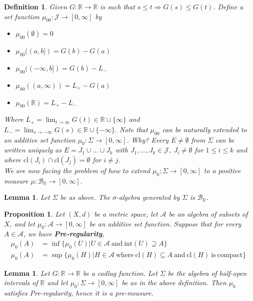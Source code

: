 \documentclass[letterpaper, 12pt]{article}
\newcommand{\cB}{\mathcal{B}}
\newcommand{\cJ} {\mathcal{J}}
\newcommand{\bR}{\mathbb{R}}
\newcommand{\sA}{\mathcal{A}}
\theoremstyle{stdthm}
\newtheorem{lem}[thm]{Lemma}
\newtheorem{prop}[thm]{Proposition}
\theoremstyle{stddef}
\newtheorem{defn}[thm]{Definition}
\theoremstyle{stdnonum}
\theoremstyle{stdqands}
\theoremstyle{stdbold}
\begin{document}
\begin{defn}
Given $G: \bR \rightarrow \bR$ is such that $s\leq t \Rightarrow G(s) \leq G(t)$. Define a set function $\mu_{00}: \cJ \rightarrow [0,\infty]$ by
\begin{itemize}
\item $\mu_{00}(\emptyset) = 0$
\item $\mu_{00} ((a,b]) = G(b) - G(a)$
\item $\mu_{00}((-\infty,b]) = G(b) - L_{-}$
\item $\mu_{00}((a,\infty)) = L_{+} - G(a)$
\item $\mu_{00}(\bR) = L_{+} - L_{-}$
\end{itemize}
Where $L_{+} = \lim_{t\rightarrow \infty} G(t) \in \bR \cup \{\infty\}$ and $L_{-}= \lim_{s\rightarrow -\infty} G(s) \in \bR \cup \{-\infty\}$. Note that $\mu_{00}$ can be naturally extended to an additive set function $\mu_0: \Sigma \rightarrow [0,\infty]$. Why? Every $E \neq \emptyset$ from $\Sigma$ can be written uniquely as $E = J_1 \cup \dots \cup J_k$ with  $J_1,\dots, J_k \in \cJ$, $J_i \neq \emptyset$ for $1\leq i \leq k$ and where $\text{cl}(J_i) \cap \text{cl}(J_j) = \emptyset$ for $i\neq j$.   \\

\noindent We are now facing the problem of how to extend $\mu_0: \Sigma \rightarrow [0,\infty]$ to a positive measure $\mu: \cB_\bR \rightarrow [0,\infty]$. 
\end{defn}

\begin{lem}
Let $\Sigma$ be as above. The $\sigma$-algebra generated by $\Sigma$ is $\cB_\bR$. 
\end{lem}

\begin{prop}
Let $(X,d)$ be a metric space, let $\sA$ be an algebra of subsets of $X$, and let $\mu_0: \sA \rightarrow  [0,\infty]$ be an additive set function. Suppose that for every $A \in \sA$, we have {\bf Pre-regularity},
\begin{align*}
 \mu_0 (A) &= \inf\{ \mu_0(U) | U \in \sA \mathrm{\ and\ int}(U) \supseteq A\} \\
 \mu_0(A) &= \sup\{ \mu_0(H) | H \in \sA \mathrm{\ where\ cl}(H) \subseteq A \mathrm{\ and\ cl}(H) \mathrm{\ is\ compact}\}
 \end{align*}
\end{prop}

\begin{lem}
Let $G: \bR \rightarrow \bR$ be a cadlag function. Let $\Sigma$ be the algebra of half-open intervals of $\bR$ and let $\mu_0: \Sigma \rightarrow [0,\infty]$ be as in the above definition. Then $\mu_0$ satisfies Pre-regularity, hence it is a pre-measure. 
\end{lem}
\end{document}
